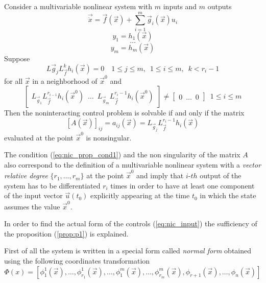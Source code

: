 \begin{prop}\label{prop:p1}
  Consider a multivariable nonlinear system with $m$ inputs and $m$ outputs
  \[
  \vec{\dot{x}} = \vec{f}(\vec{x}) + \sum\limits_{i=1}^m \vec{g}_{i}(\vec{x}) u_{i}
  \]
  \[
  y_{1} = h_{1}(\vec{x})
  \]
  \[
  \hdots
  \]
  \[
  y_{m} = h_{m}(\vec{x})
  \]
  Suppose
  \begin{equation}\label{eq:nic_prop_cond1}
    L{\vec{g}_j}L_{\vec{f}}^{k}h_{i}(\vec{x}) = 0 \quad 1 \le j \le m, \enspace 1 \le i \le m, \enspace k < r_i-1
  \end{equation}
  for all $\vec{x}$ in a neighborhood of $\vec{x}^{0}$ and
  \[
  \begin{bmatrix}
    L_{\vec{g}_1}L_{\vec{f}}^{r_{i-1}}h_i(\vec{x}^{0}) \enspace \hdots \enspace L_{\vec{g}_m}L_{\vec{f}}^{r_i-1}h_i(\vec{x}^{0})
  \end{bmatrix}
  \ne
  \begin{bmatrix}
    0 \enspace \hdots \enspace 0
  \end{bmatrix}
  \enspace 1 \le i \le m
  \]
  Then the noninteracting control problem is solvable if and only if the matrix
  \begin{equation}\label{eq:decoupling_matrix}
    \left[A(\vec{x})\right]_{ij} = a_{ij}(\vec{x}) = L_{\vec{g}_j}L_{\vec{f}}^{r_i-1}h_{i}(\vec{x})
  \end{equation}
  evaluated at the point $\vec{x}^{0}$ is nonsingular.
\end{prop}
The condition (\ref{eq:nic_prop_cond1}) and the non singularity of the matrix $A$
also correspond to the definition of a multivariable nonlinear system with a
\emph{vector relative degree} $\{r_1,\hdots,r_m\}$ at the point $\vec{x}^{0}$
and imply that $i$-$th$ output of the system has to be differentiated $r_i$ times
in order to have at least one component of the input vector $\vec{u}(t_0)$ explicitly
appearing at the time $t_0$ in which the state assumes the value
$\vec{x}^0$.
\par
In order to find the actual form of the controls (\ref{eq:nic_input}) the sufficiency
of the proposition (\ref{prop:p1}) is explained.
\par
First of all the system is written in a special form called \emph{normal form}
obtained using the following coordinates transformation
{\small
  \[
  \Phi(x) = [
    \phi_{1}^{1}(\vec{x}),\hdots,\phi_{r_{1}}^{1}(\vec{x}),
    \hdots,
    \phi_{1}^{m}(\vec{x}),\hdots,\phi_{r_{m}}^{m}(\vec{x}),
    \phi_{r+1}(\vec{x}),\hdots,\phi_{n}(\vec{x})
  ]
  \]
}
